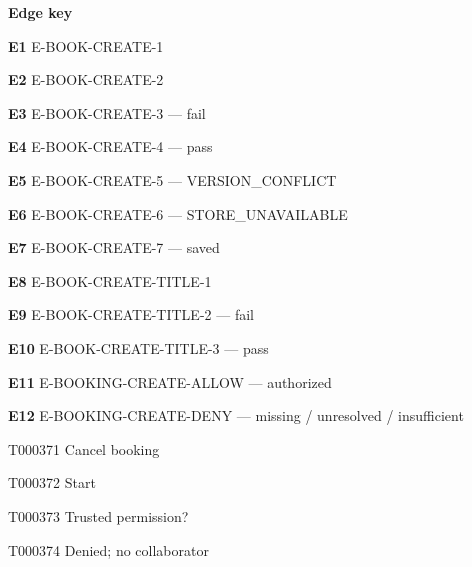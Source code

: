 \documentclass[11pt,a4paper]{article}
\begin{document}
\noindent\textbf{Edge key}\par
\begingroup\small\raggedright\setlength{\parskip}{1pt}
\noindent\textbf{E1} E-BOOK-CREATE-1\par
\noindent\textbf{E2} E-BOOK-CREATE-2\par
\noindent\textbf{E3} E-BOOK-CREATE-3 --- fail\par
\noindent\textbf{E4} E-BOOK-CREATE-4 --- pass\par
\noindent\textbf{E5} E-BOOK-CREATE-5 --- VERSION\_CONFLICT\par
\noindent\textbf{E6} E-BOOK-CREATE-6 --- STORE\_UNAVAILABLE\par
\noindent\textbf{E7} E-BOOK-CREATE-7 --- saved\par
\noindent\textbf{E8} E-BOOK-CREATE-TITLE-1\par
\noindent\textbf{E9} E-BOOK-CREATE-TITLE-2 --- fail\par
\noindent\textbf{E10} E-BOOK-CREATE-TITLE-3 --- pass\par
\noindent\textbf{E11} E-BOOKING-CREATE-ALLOW --- authorized\par
\noindent\textbf{E12} E-BOOKING-CREATE-DENY --- missing / unresolved / insufficient\par
\endgroup
\clearpage
\begin{atlastext}{T000371}
Cancel booking
\end{atlastext}
\begin{atlastext}{T000372}
Start
\end{atlastext}
\begin{atlastext}{T000373}
Trusted permission?
\end{atlastext}
\begin{atlastext}{T000374}
Denied; no collaborator
\end{atlastext}
\end{document}
